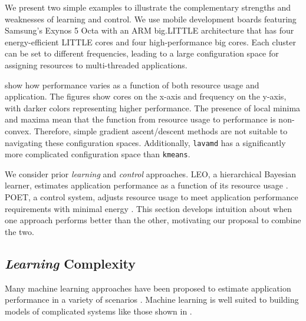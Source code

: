We present two simple examples to illustrate the complementary
strengths and weaknesses of learning and control.  We use mobile
development boards featuring Samsung's Exynos 5 Octa with an ARM
big.LITTLE architecture that has four energy-efficient LITTLE cores
and four high-performance big cores.  Each cluster can be set to
different frequencies, leading to a large configuration space for
assigning resources to multi-threaded applications.

 show how performance
varies as a function of both resource usage and application.  The
figures show cores on the x-axis and frequency on the y-axis, with
darker colors representing higher performance.  The presence of local
minima and maxima mean that the function from resource usage to
performance is non-convex.  Therefore, simple gradient ascent/descent
methods are not suitable to navigating these configuration spaces.
Additionally, \texttt{lavamd} has a significantly more complicated
configuration space than \texttt{kmeans}.


We consider prior \emph{learning} and \emph{control} approaches.  LEO,
a hierarchical Bayesian learner, estimates application performance as
a function of its resource usage \cite{LEO}. POET, a control system,
adjusts resource usage to meet application performance requirements
with minimal energy \cite{POET}.  This section develops intuition
about when one approach performs better than the other, motivating our
proposal to combine the two.

\subsection{\emph{Learning} Complexity}
Many machine learning approaches have been proposed to estimate
application performance in a variety of scenarios
\cite{reddiHPCA2013,LeeBrooks2006,CPR,ParallelismDial,Flicker,LeeBrooks,Koala}.
Machine learning is well suited to building models of complicated
systems like those shown in
.

